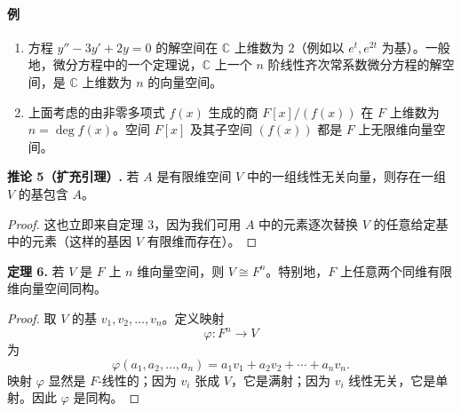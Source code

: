 \paragraph{例}
\begin{enumerate}[label=(\arabic*)]
\item 方程 $y''-3y'+2y=0$ 的解空间在 $\mathbb C$ 上维数为 $2$（例如以 $e^t,e^{2t}$ 为基）。一般地，微分方程中的一个定理说，$\mathbb C$ 上一个 $n$ 阶线性齐次常系数微分方程的解空间，是 $\mathbb C$ 上维数为 $n$ 的向量空间。
\item 上面考虑的由非零多项式 $f(x)$ 生成的商 $F[x]/(f(x))$ 在 $F$ 上维数为 $n=\deg f(x)$。空间 $F[x]$ 及其子空间 $(f(x))$ 都是 $F$ 上无限维向量空间。
\end{enumerate}

\noindent\textbf{推论 5（扩充引理）.} 若 $A$ 是有限维空间 $V$ 中的一组线性无关向量，则存在一组 $V$ 的基包含 $A$。

\begin{proof}
这也立即来自定理 3，因为我们可用 $A$ 中的元素逐次替换 $V$ 的任意给定基中的元素（这样的基因 $V$ 有限维而存在）。
\end{proof}

\noindent\textbf{定理 6.} 若 $V$ 是 $F$ 上 $n$ 维向量空间，则 $V\cong F^n$。特别地，$F$ 上任意两个同维有限维向量空间同构。

\begin{proof}
取 $V$ 的基 $v_1,v_2,\ldots,v_n$。定义映射
\[
\varphi:F^n\longrightarrow V
\]
为
\[
\varphi(a_1,a_2,\ldots,a_n)=a_1v_1+a_2v_2+\cdots+a_nv_n.
\]
映射 $\varphi$ 显然是 $F$-线性的；因为 $v_i$ 张成 $V$，它是满射；因为 $v_i$ 线性无关，它是单射。因此 $\varphi$ 是同构。
\end{proof}

